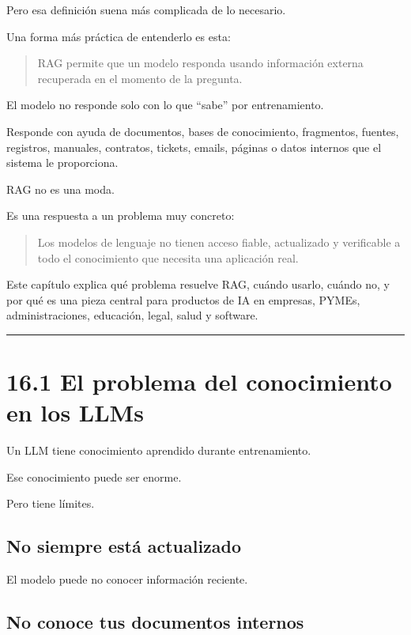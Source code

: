 Pero esa definición suena más complicada de lo necesario.

Una forma más práctica de entenderlo es esta:

\begin{quote}
RAG permite que un modelo responda usando información externa recuperada
en el momento de la pregunta.
\end{quote}

El modelo no responde solo con lo que ``sabe'' por entrenamiento.

Responde con ayuda de documentos, bases de conocimiento, fragmentos,
fuentes, registros, manuales, contratos, tickets, emails, páginas o
datos internos que el sistema le proporciona.

RAG no es una moda.

Es una respuesta a un problema muy concreto:

\begin{quote}
Los modelos de lenguaje no tienen acceso fiable, actualizado y
verificable a todo el conocimiento que necesita una aplicación real.
\end{quote}

Este capítulo explica qué problema resuelve RAG, cuándo usarlo, cuándo
no, y por qué es una pieza central para productos de IA en empresas,
PYMEs, administraciones, educación, legal, salud y software.

\begin{center}\rule{0.5\linewidth}{0.5pt}\end{center}

\section{16.1 El problema del conocimiento en los
LLMs}\label{el-problema-del-conocimiento-en-los-llms}

Un LLM tiene conocimiento aprendido durante entrenamiento.

Ese conocimiento puede ser enorme.

Pero tiene límites.

\subsection{No siempre está
actualizado}\label{no-siempre-estuxe1-actualizado}

El modelo puede no conocer información reciente.

\subsection{No conoce tus documentos
internos}\label{no-conoce-tus-documentos-internos}

